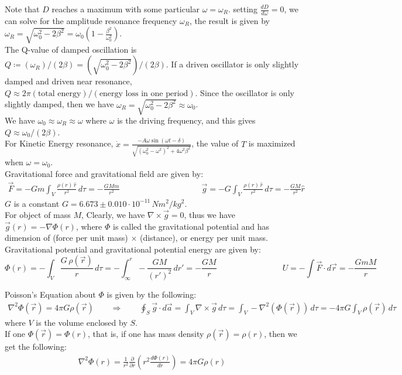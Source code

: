 \documentclass[11pt]{article}
\theoremstyle{break}
\theoremstyle{break}
\newcommand{\ee}[1]{\cdot 10^{#1}}
\begin{document}
Note that $D$ reaches a maximum with some particular $\omega = \omega_R$. setting $\frac{dD}{d\omega} = 0$, we can solve for the amplitude resonance frequency $\omega_R$, the result is given by $\omega_R = \sqrt{\omega_0^2 - 2\beta^2} = \omega_0 \left( 1- \frac{\beta^2}{\omega_0^2}\right)$.\\

The Q-value of damped oscillation is $Q\coloneqq (\omega_R)/(2\beta) = (\sqrt{\omega_0^2 - 2\beta^2})/({2\beta})$. If a driven oscillator is only slightly damped and driven near resonance, $Q \approx 2\pi {(\text{total energy})}/{(\text{energy loss in one period})}$.
Since the oscillator is only slightly damped, then we have $\omega_R = \sqrt{\omega_0^2 - 2\beta^2} \approx \omega_0$. \\
We have $\omega_0 \approx \omega_R \approx \omega$ where $\omega$ is the driving frequency, and this gives $Q \approx \omega_0 /(2\beta)$. \\

For Kinetic Energy resonance, $\dot{x} = \frac{-A\omega \sin(\omega t-\delta)}{\sqrt{(\omega_0^2 -\omega^2)^2 +4\omega^2 \beta^2}}$, the value of $T$ is maximized when $ \omega = \omega_0$.\\


Gravitational force and gravitational field are given by:
\begin{align*}
\vec{F} =-G m \int_V \frac{\rho(r)\,\hat{r}}{r^2}\, d\tau= -\frac{GMm}{r^2} \qquad \qquad \qquad\qquad\qquad
\vec{g} =-G  \int_V \frac{\rho(r)\,\hat{r}}{r^2}\, d\tau= -\frac{GM}{r^2}\hat{r}
\end{align*}
$G$ is a constant $G = 6.673\pm 0.010 \ee{-11}\, Nm^2/kg^2$.\\

For object of mass $M$, Clearly, we have $\nabla \times \vec{g} = 0$, thus we have $\vec{g}(r) = -\nabla \Phi(r)$, where $\Phi$ is called the gravitational potential and has dimension of (force per unit mass) $\times$ (distance), or energy per unit mass. Gravitational potential and gravitational potential energy are given by:
$$\Phi(r) =- \int_V \frac{G\,\rho(\vec{r})}{r}\, d\tau = -\int_{\infty}^r -\frac{GM}{(r')^2} \, dr' = -\frac{GM}{r}\qquad\qquad\qquad\qquad U = -\int \vec{F}\cdot d\vec{r} = -\frac{GmM}{r}$$

Poisson's Equation about $\Phi$ is given by the following:
\begin{align*}
\nabla^2 \Phi(\vec{r}) = 4\pi G \rho(\vec{r}) \qquad \Rightarrow \qquad \oint_S \vec{g}\cdot d\vec{a} = \int_V \nabla \times \vec{g}\,d\tau = \int_V -\nabla^2 (\Phi(\vec{r})) \, d\tau = -4\pi G \int_V \rho(\vec{r}) \, d\tau
\end{align*}
where $V$ is the volume enclosed by $S$. \\

If one $\Phi(\vec{r}) = \Phi(r)$, that is, if one has mass density $\rho(\vec{r}) = \rho(r)$, then we get the following:
\begin{align*}
\nabla^2 \Phi(r) = \frac{1}{r^2}\frac{\partial}{\partial r} \left( r^2 \frac{d\Phi(r)}{dr}\right) =  4\pi G \rho(r)
\end{align*}
\end{document}
